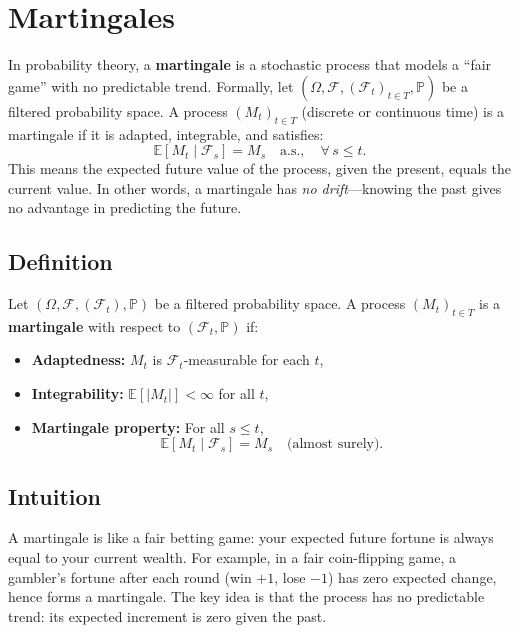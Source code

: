 \section{Martingales}

In probability theory, a \textbf{martingale} is a stochastic process that models a ``fair game'' with no predictable trend. Formally, let \( (\Omega,\mathcal{F},(\mathcal{F}_t)_{t\in T},\mathbb{P}) \) be a filtered probability space. A process \( (M_t)_{t\in T} \) (discrete or continuous time) is a martingale if it is adapted, integrable, and satisfies:
\[
\mathbb{E}[M_t \mid \mathcal{F}_s] = M_s \quad \text{a.s.}, \quad \forall\, s \le t.
\]
This means the expected future value of the process, given the present, equals the current value. In other words, a martingale has \emph{no drift}—knowing the past gives no advantage in predicting the future.

\subsection*{Definition}
Let \( (\Omega, \mathcal{F}, (\mathcal{F}_t), \mathbb{P}) \) be a filtered probability space. A process \( (M_t)_{t \in T} \) is a \textbf{martingale} with respect to \( (\mathcal{F}_t, \mathbb{P}) \) if:
\begin{itemize}
  \item \textbf{Adaptedness:} \( M_t \) is \( \mathcal{F}_t \)-measurable for each \( t \),
  \item \textbf{Integrability:} \( \mathbb{E}[|M_t|] < \infty \) for all \( t \),
  \item \textbf{Martingale property:} For all \( s \le t \),
  \[
  \mathbb{E}[M_t \mid \mathcal{F}_s] = M_s \quad \text{(almost surely)}.
  \]
\end{itemize}

\subsection*{Intuition}
A martingale is like a fair betting game: your expected future fortune is always equal to your current wealth. For example, in a fair coin-flipping game, a gambler’s fortune after each round (win \( +1 \), lose \( -1 \)) has zero expected change, hence forms a martingale. The key idea is that the process has no predictable trend: its expected increment is zero given the past.

